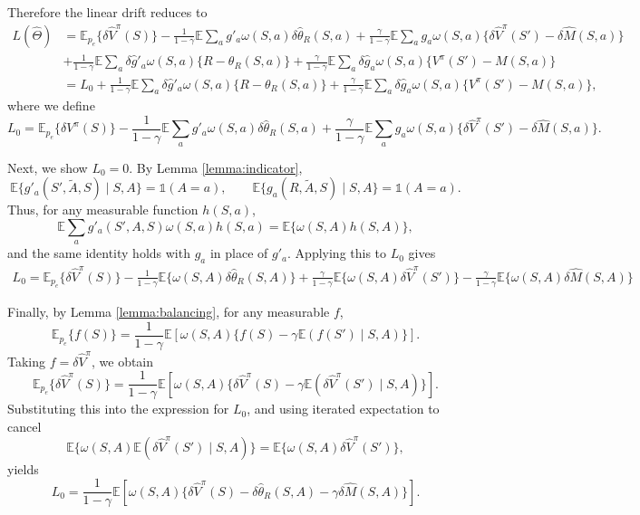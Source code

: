 \documentclass[12pt]{article}
\newcommand{\0}{\boldsymbol{0}}
\newcommand{\E}{\mathbb{E}}
\begin{document}
Therefore the linear drift reduces to
\begin{align*}
L(\widehat\Theta)&=\E_{p_e}\{\delta \widehat V^\pi(S)\}-\frac{1}{1-\gamma}
\E\sum_a g'_a\omega(S,a)\delta \widehat \theta_R(S,a)
+\frac{\gamma}{1-\gamma}\E\sum_a g_a\omega(S,a)\{\delta \widehat V^\pi(S')-\delta \widehat M(S,a)\}\\
&+\frac{1}{1-\gamma}
\E\sum_a \delta \widehat g'_a\omega(S,a)\{R-\theta_R(S,a)\}+\frac{\gamma}{1-\gamma}\E\sum_a \delta \widehat g_a\omega(S,a)\{V^\pi(S')-M(S,a)\} \\
&= L_0 +\frac{1}{1-\gamma}
\E\sum_a \delta \widehat g'_a\omega(S,a)\{R-\theta_R(S,a)\}+\frac{\gamma}{1-\gamma}\E\sum_a \delta \widehat g_a\omega(S,a)\{V^\pi(S')-M(S,a)\}, 
\end{align*}
where we define
\[
L_0 = \E_{p_e}\{\delta V^\pi(S)\}-\frac{1}{1-\gamma}
\E\sum_a g'_a\omega(S,a)\delta \widehat \theta_R(S,a)
+\frac{\gamma}{1-\gamma}\E\sum_a g_a\omega(S,a)\{\delta \widehat V^\pi(S')-\delta \widehat M(S,a)\}.
\]

Next, we show $L_0 = 0$.
By Lemma \ref{lemma:indicator},
\[
\E\{g'_a(S',\widetilde A,S)\mid S,A\}=\mathds 1(A=a),
\qquad
\E\{g_a(R,\widetilde A,S)\mid S,A\}=\mathds 1(A=a).
\]
Thus, for any measurable function \(h(S,a)\),
\[
\E\sum_a g'_a(S',A,S)\omega(S,a)h(S,a)=\E\{\omega(S,A)h(S,A)\},
\]
and the same identity holds with \(g_a\) in place of \(g'_a\). Applying this to $L_0$ gives
\begin{align*}
L_0=\E_{p_e}\{\delta \widehat V^\pi(S)\}-\frac{1}{1-\gamma}\E\{\omega(S,A)\delta \widehat \theta_R(S,A)\}
+\frac{\gamma}{1-\gamma}\E\{\omega(S,A)\delta \widehat V^\pi(S')\}-\frac{\gamma}{1-\gamma}\E\{\omega(S,A)\delta \widehat M(S,A)\}
\end{align*}

Finally, by Lemma \ref{lemma:balancing}, for any measurable \(f\),
\[
\E_{p_e}\{f(S)\}=\frac{1}{1-\gamma}\E\left[\omega(S,A)\{f(S)-\gamma \E(f(S')\mid S,A)\}\right].
\]
Taking \(f=\delta \widehat V^\pi\), we obtain
\[
\E_{p_e}\{\delta \widehat V^\pi(S)\}=\frac{1}{1-\gamma}\E\left[\omega(S,A)\{\delta \widehat V^\pi(S)-\gamma \E(\delta \widehat V^\pi(S')\mid S,A)\}\right].
\]
Substituting this into the expression for \(L_0\), and using iterated expectation to cancel
\[
\E\{\omega(S,A)\E(\delta \widehat V^\pi(S')\mid S,A)\}=\E\{\omega(S,A)\delta \widehat V^\pi(S')\},
\]
yields
\[
L_0=\frac{1}{1-\gamma}\E\left[\omega(S,A)\{\delta \widehat V^\pi(S)-\delta \widehat \theta_R(S,A)-\gamma\delta \widehat M(S,A)\}\right].
\]
\end{document}
